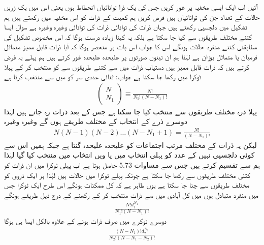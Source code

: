 آئیں اب ایک ایسی مخفیہ پر غور کریں جس کی یک ذرا توانائیاں     انحطاط     ہوں یعنی اس میں یک زریں حالات کے تعداد  جن کی توانائیاں  ہیں فرض کریں ہم کمیت  کے  ذرات کو اس ‏مخفیہ میں رکھتے ہیں ہم تشکیل     میں دلچسپی رکھتے ہیں جہاں  ذرات کی توانائی   ذرات کی توانائی  وغیرہ وغیرہ ہے سوال ایسا کتنے مختلف طریقوں سے کیا جا سکتا ہے بلکہ یہ کہنا زیادہ درست ہوگا کہ اس مخصوص تشکیل کی مطابقتی کتنے منفرد حالات ہونگے اس کا جواب  اس بات پر منحصر ہوگا کہ آیا ذرات قابل ممیز متماثل فرميان یا متماثل بوزان ہے لہٰذا ہم ان تینوں صورتوں پر علیحدہ علیحدہ غور کرتے ہیں ہم پہلے یہ فرض کرتے ہیں کہ ذرات قابل ممیز ہیں دستیاب  ذرات میں سے کتنے طریقوں سے  کو منتخب کر کے پہلا  ٹوکرا میں رکھا جا سکتا ہے جواب: ثنائی عددی سر  کو  میں سے منتخب کرتا ہے 
\begin{align}
\begin{pmatrix}
N \\
N_1
\end{pmatrix}
\equiv \frac{N!}{N_1 ! (N - N_1) !}
\end{align}
پہلا ذرہ  مختلف طریقوں سے منتخب کیا جا سکتا ہے جس کے بعد  ذرات رہ جاتے ہیں لہٰذا دوسرے ذرے کے انتخاب کے  مختلف طریقے ہوں گے وغیرہ وغیرہ 
\begin{align*}
N(N - 1) (N - 2) \dotsc (N - N_1 + 1) = \frac{N !}{(N - N_1) !}
\end{align*}
لیکن یہ  ذرات کے  مختلف مرتب اجتماعات کو علیحدہ علیحدہ گنتا  ہے جبکہ ہمیں اس سے کوئی دلچسپی نہیں کے عدد  کو پہلی انتخاب میں یا  ویں انتخاب میں منتخب کیا گیا لہٰذا ہم  سے تقسیم کرتے ہیں جس سے مساوات 5.73 حاصل ہوتا ہے اب پہلی ٹوکرا میں ان  ذرات کو کتنی مختلف طریقوں سے رکھا جا سکتا ہے چونکہ پہلے ٹوکرا میں  حالات ہیں لہٰذا ہر ایک ذروی کو  مختلف طریقوں سے چنا جا سکتا ہے یوں ظاہر ہے کہ کل ممکنات  ہونگے اس طرح ایک ٹوکرا جس میں  منفرد متبادل ہوں میں کل آبادی  میں سے  ذرات منتخب کر کے رکھنے کے درج ذیل طریقے ہونگے 
\begin{align*}
\frac{N ! d_1^{N_1}}{N_1 ! (N - N_1) !}
\end{align*}
دوسرے ٹوکرے میں صرف  ذرات ہونے کے علاوہ بالکل ایسا ہی ہوگا 
\begin{align*}
\frac{(N - N_1) ! d_2^{N_2}}{N_2 ! (N - N_1 - N_2) !}
\end{align*}

